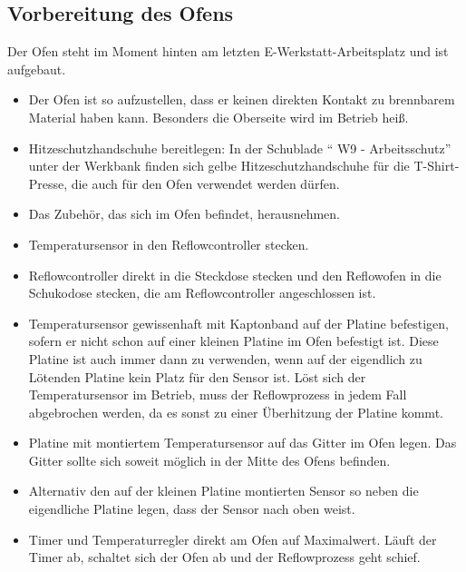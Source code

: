\documentclass{\basedir/fablab-document}
\begin{document}
\subsection{Vorbereitung des Ofens}
Der Ofen steht im Moment hinten am letzten E-Werkstatt-Arbeitsplatz und ist aufgebaut.
\begin{itemize}
	\item Der Ofen ist so aufzustellen, dass er keinen direkten Kontakt zu brennbarem Material haben kann. Besonders die Oberseite wird im Betrieb heiß.
	\item Hitzeschutzhandschuhe bereitlegen: In der Schublade \enquote{ W9 - Arbeitsschutz} unter der Werkbank finden sich gelbe Hitzeschutzhandschuhe für die T-Shirt-Presse, die auch für den Ofen verwendet werden dürfen.
	\item Das Zubehör, das sich im Ofen befindet, herausnehmen.
	\item Temperatursensor in den Reflowcontroller stecken.
	\item Reflowcontroller direkt in die Steckdose stecken und den Reflowofen in die Schukodose stecken, die am Reflowcontroller angeschlossen ist.
	\item Temperatursensor gewissenhaft mit Kaptonband auf der Platine befestigen, sofern er nicht schon auf einer kleinen Platine im Ofen befestigt ist. Diese Platine ist auch immer dann zu verwenden, wenn auf der eigendlich zu Lötenden Platine kein Platz für den Sensor ist. Löst sich der Temperatursensor im Betrieb, muss der Reflowprozess in jedem Fall abgebrochen werden, da es sonst zu einer Überhitzung der Platine kommt.
	\item Platine mit montiertem Temperatursensor auf das Gitter im Ofen legen. Das Gitter sollte sich soweit möglich in der Mitte des Ofens befinden.
	\item Alternativ den auf der kleinen Platine montierten Sensor so neben die eigendliche Platine legen, dass der Sensor nach oben weist.
	\item Timer und Temperaturregler direkt am Ofen auf Maximalwert. Läuft der Timer ab, schaltet sich der Ofen ab und der Reflowprozess geht schief.
\end{itemize}
\end{document}
